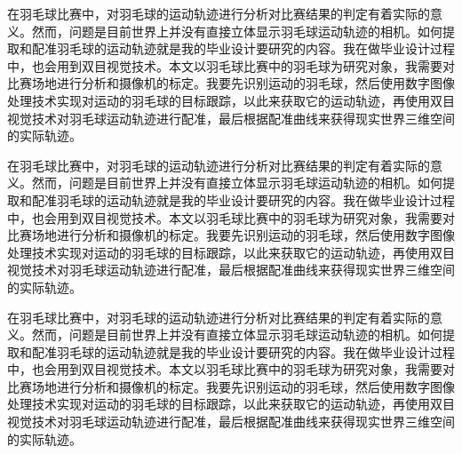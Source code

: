 在羽毛球比赛中，对羽毛球的运动轨迹进行分析对比赛结果的判定有着实际的意义。然而，问题是目前世界上并没有直接立体显示羽毛球运动轨迹的相机。如何提取和配准羽毛球的运动轨迹就是我的毕业设计要研究的内容。我在做毕业设计过程中，也会用到双目视觉技术。本文以羽毛球比赛中的羽毛球为研究对象，我需要对比赛场地进行分析和摄像机的标定。我要先识别运动的羽毛球，然后使用数字图像处理技术实现对运动的羽毛球的目标跟踪，以此来获取它的运动轨迹，再使用双目视觉技术对羽毛球运动轨迹进行配准，最后根据配准曲线来获得现实世界三维空间的实际轨迹。

在羽毛球比赛中，对羽毛球的运动轨迹进行分析对比赛结果的判定有着实际的意义。然而，问题是目前世界上并没有直接立体显示羽毛球运动轨迹的相机。如何提取和配准羽毛球的运动轨迹就是我的毕业设计要研究的内容。我在做毕业设计过程中，也会用到双目视觉技术。本文以羽毛球比赛中的羽毛球为研究对象，我需要对比赛场地进行分析和摄像机的标定。我要先识别运动的羽毛球，然后使用数字图像处理技术实现对运动的羽毛球的目标跟踪，以此来获取它的运动轨迹，再使用双目视觉技术对羽毛球运动轨迹进行配准，最后根据配准曲线来获得现实世界三维空间的实际轨迹。

在羽毛球比赛中，对羽毛球的运动轨迹进行分析对比赛结果的判定有着实际的意义。然而，问题是目前世界上并没有直接立体显示羽毛球运动轨迹的相机。如何提取和配准羽毛球的运动轨迹就是我的毕业设计要研究的内容。我在做毕业设计过程中，也会用到双目视觉技术。本文以羽毛球比赛中的羽毛球为研究对象，我需要对比赛场地进行分析和摄像机的标定。我要先识别运动的羽毛球，然后使用数字图像处理技术实现对运动的羽毛球的目标跟踪，以此来获取它的运动轨迹，再使用双目视觉技术对羽毛球运动轨迹进行配准，最后根据配准曲线来获得现实世界三维空间的实际轨迹。
